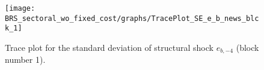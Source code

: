 \begin{figure}[H]
\centering
  \texttt{[image: BRS\_sectoral\_wo\_fixed\_cost/graphs/TracePlot\_SE\_e\_b\_news\_blck\_1]}\\
    \caption{Trace plot for the standard deviation of structural shock ${e_{b,-4}}$ (block number 1).}
\end{figure}
